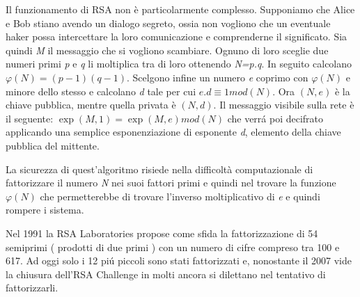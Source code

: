 Il funzionamento di RSA non è particolarmente complesso.
Supponiamo che Alice e Bob stiano avendo un dialogo segreto, ossia non vogliono che un eventuale haker possa intercettare la loro comunicazione e comprenderne il significato.
Sia quindi \emph{M} il messaggio che si vogliono scambiare.
Ognuno di loro sceglie due numeri primi \emph{p} e \emph{q} li moltiplica tra di loro ottenendo \emph{N=p.q}.
In seguito calcolano $\varphi( N)  = ( p-1)(q-1)$.
Scelgono infine un numero \emph{e} coprimo con $\varphi(N)$ e minore dello stesso e calcolano \emph{d} tale per cui $e.d\equiv 1 mod(N)$.
Ora $(N, e)$ è la chiave pubblica, mentre quella privata è $(N, d)$.
Il messaggio visibile sulla rete è il seguente: $\exp(M,1)=\exp(M,e)mod(N)$ che verr\'{a} poi decifrato applicando una semplice esponenziazione di esponente \emph{d}, elemento della chiave pubblica del mittente.

La sicurezza di quest'algoritmo risiede nella difficoltà computazionale di fattorizzare il numero \emph{N} nei suoi fattori primi e quindi nel trovare la funzione $\varphi(N)$
che permetterebbe di trovare l'inverso moltiplicativo di \emph{e} e quindi rompere i sistema.

Nel 1991 la RSA Laboratories propose come sfida la fattorizzazione di 54 semiprimi ( prodotti di due primi ) con un numero di cifre compreso tra 100 e 617.
Ad oggi solo i 12 pi\'{u} piccoli sono stati fattorizzati e, nonostante il 2007 vide la chiusura dell'RSA Challenge in molti ancora si dilettano nel tentativo di fattorizzarli.